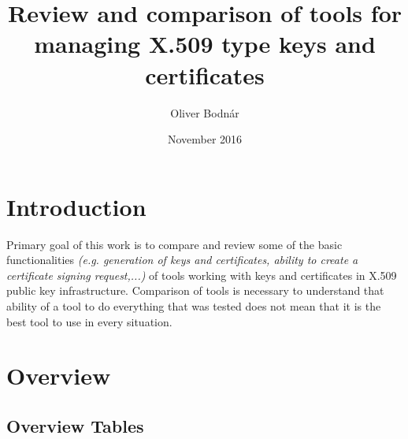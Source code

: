 \documentclass[10pt, a4paper]{report}
\title{Review and comparison of tools for managing X.509 type keys and certificates}
\author{Oliver Bodnár}
\date{November 2016}
\begin{document}
\maketitle

\tableofcontents

\newpage

\part{Introduction}

Primary goal of this work is to compare and review some of the basic functionalities \textit{(e.g. generation of keys and certificates, ability to create a certificate signing request,...)} of tools working with keys and certificates in X.509 public key infrastructure. Comparison of tools is necessary to understand that ability of a tool to do everything that was tested does not mean that it is the best tool to use in every situation.
\part{Overview}

\chapter{Overview Tables}
\end{document}
